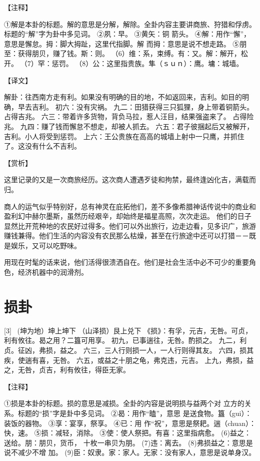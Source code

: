 \documentclass[12pt,UTF8]{ctexbook}
\begin{document}
【注释】

①解是本卦的标题。解的意思是分解，解除。全卦内容主要讲商旅、狩猎和俘虏。标题的“解”字为卦中多见词。
②夙：早。
③黄矢：铜 箭头。
④解：用作“懈”，意思是懈怠。拇：脚大拇趾，这里代指脚。解 而拇：意思是说不想走路。
⑤朋至：获得朋贝，赚了钱。斯：则。
（6）维：系，束缚。有：又。解：解开，松开。
（7）罕：惩罚。
（8）公：这里指贵族。隼（ｓｕｎ）：鹰。墉：城墙。

【译文】

解卦：往西南方走有利。如果没有明确的目的地，不如返回来，吉利。如目的明确，早去吉利。
初六：没有灾祸。
九二：田猎获得三只狐狸，身上带着铜箭头。占得吉兆。
六三：带着许多货物，背负马拉，惹人汪目，结果强盗来了。 占得险兆。
九四：赚了钱而懈怠不想走，却被人抓去。
六五：君子彼捆起后又被解开，吉利。小人将受到惩罚。
上六：王公贵族在高高的城墙上射中一只鹰，并抓住了。这没有什么不吉利。

【赏析】

这里记录的又是一次商旅经历。这次商人遭遇歹徒和拘禁，最终逢凶化吉，满载而归。

商人的运气似乎特别好，总有神灵在庇拓他们，差不多像希腊神话传说中的商业和盈利幻中赫尔墨斯，虽然历经艰辛，却始终是福星高照，次次走运。 他们的日子显然比开荒种地的农民好过得多。他们可以外出旅行，边走边看，见多识广，旅游赚钱兼得。他们生活的内容没有农民那么枯燥，甚至在行旅途中还可以打猎－－既是娱乐，又可以吃野味。

用现在时髦的话来说，他们活得很溃洒自在。他们是社会生活中必不可少的重要角色，经济机器中的润滑剂。

\chapter{损卦}
[3] \ (坤为地）坤上坤下
（山泽损）艮上兑下
《损》：有孚，元吉，无咎。可贞，利有攸往。曷之用？二簋可用享。
初九，已事遄往，无咎。酌损之。
九二，利贞。征凶，弗损，益之。
六三，三人行则损一人，一人行则得其友。
六四，损其疾，使遄有喜，无咎。
六五，或益之十朋之龟，弗克违，元吉。
上九，弗损，益之，无咎，贞吉，利有攸往，得臣无家。

【注释】

①损是本卦的标题。损的意思是减损。全卦的内容是说明损与益两个对 立方的关系。标题的“损”字是卦中多见词。
②曷：用作“瞌”，意思 是送食物。簋（gui）：装饭的器物。
③享：宴享，祭享。
④已：用 作“祝”，意思是祭耙。遄（chuan）：快，速。
⑤损：减轻，消除。
③使：使人祭把。有喜：这里指病愈。
(6)益之：送给。朋：朋贝，货币， 十枚一串贝为朋。
(7)违：离去。
(8)弗损益之：意思是说不减少不增 加。
(9)臣：奴隶。家：家人。无家：没有家人，意思是说单身汉。
\end{document}
